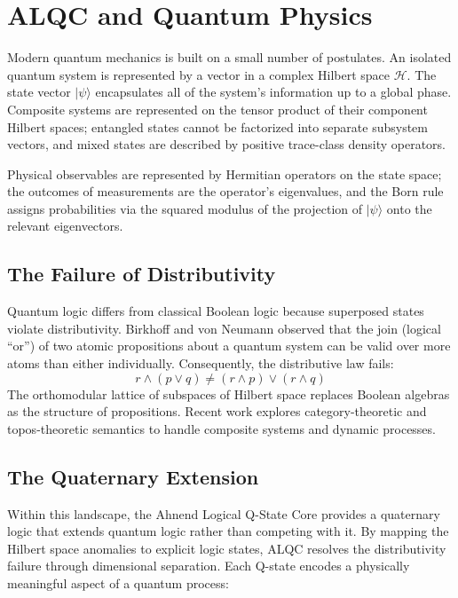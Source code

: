 \documentclass[11pt, letterpaper]{article}
\begin{document}
\section{ALQC and Quantum Physics}\label{sec:SectionQ-Y}

Modern quantum mechanics is built on a small number of postulates. An isolated quantum system is represented by a vector in a complex Hilbert space $\mathcal{H}$. The state vector $|\psi\rangle$ encapsulates all of the system's information up to a global phase. Composite systems are represented on the tensor product of their component Hilbert spaces; entangled states cannot be factorized into separate subsystem vectors, and mixed states are described by positive trace-class density operators.

Physical observables are represented by Hermitian operators on the state space; the outcomes of measurements are the operator's eigenvalues, and the Born rule assigns probabilities via the squared modulus of the projection of $|\psi\rangle$ onto the relevant eigenvectors.

\subsection{The Failure of Distributivity}
Quantum logic differs from classical Boolean logic because superposed states violate distributivity. Birkhoff and von Neumann observed that the join (logical ``or'') of two atomic propositions about a quantum system can be valid over more atoms than either individually. Consequently, the distributive law fails:
\[
r \land (p \lor q) \neq (r \land p) \lor (r \land q)
\]
The orthomodular lattice of subspaces of Hilbert space replaces Boolean algebras as the structure of propositions. Recent work explores category-theoretic and topos-theoretic semantics to handle composite systems and dynamic processes.

\subsection{The Quaternary Extension}
Within this landscape, the Ahnend Logical Q-State Core provides a quaternary logic that extends quantum logic rather than competing with it. By mapping the Hilbert space anomalies to explicit logic states, ALQC resolves the distributivity failure through dimensional separation. Each Q-state encodes a physically meaningful aspect of a quantum process:
\end{document}
